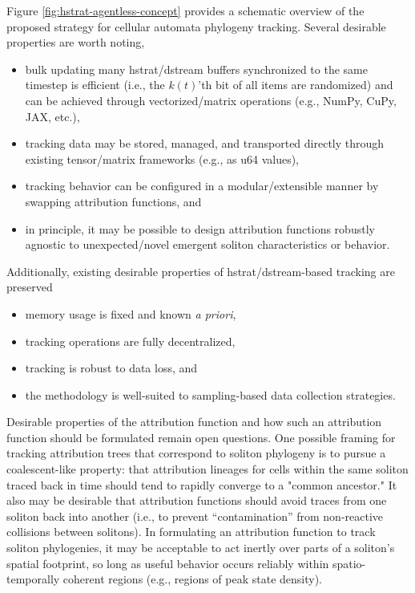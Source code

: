 Figure \ref{fig:hstrat-agentless-concept} provides a schematic overview of the proposed strategy for cellular automata phylogeny tracking.
Several desirable properties are worth noting,
\begin{itemize}
\item bulk updating many hstrat/dstream buffers synchronized to the same timestep is efficient (i.e., the $k(t)$'th bit of all items are randomized) and can be achieved through vectorized/matrix operations (e.g., NumPy, CuPy, JAX, etc.),
\item tracking data may be stored, managed, and transported directly through existing tensor/matrix frameworks (e.g., as u64 values),
\item tracking behavior can be configured in a modular/extensible manner by swapping attribution functions, and
\item in principle, it may be possible to design attribution functions robustly agnostic to unexpected/novel emergent soliton characteristics or behavior.
\end{itemize}
Additionally, existing desirable properties of hstrat/dstream-based tracking are preserved
\begin{itemize}
\item memory usage is fixed and known \textit{a priori},
\item tracking operations are fully decentralized,
\item tracking is robust to data loss, and
\item the methodology is well-suited to sampling-based data collection strategies.
\end{itemize}

Desirable properties of the attribution function and how such an attribution function should be formulated remain open questions.
One possible framing for tracking attribution trees that correspond to soliton phylogeny is to pursue a coalescent-like property: that attribution lineages for cells within the same soliton traced back in time should tend to rapidly converge to a "common ancestor."
It also may be desirable that attribution functions should avoid traces from one soliton back into another (i.e., to prevent ``contamination'' from non-reactive collisions between solitons).
In formulating an attribution function to track soliton phylogenies, it may be acceptable to act inertly over parts of a soliton's spatial footprint, so long as useful behavior occurs reliably within spatio-temporally coherent regions (e.g., regions of peak state density).

